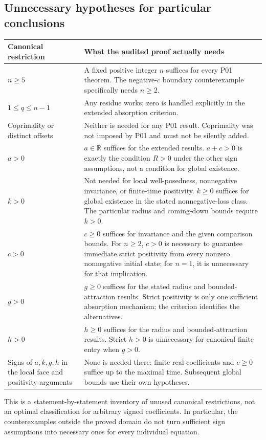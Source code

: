 \documentclass[11pt]{article}
\newcommand{\RR}{\mathbb R}
\begin{document}
\subsection{Unnecessary hypotheses for particular conclusions}
\begin{longtable}{@{}P{0.30\textwidth}P{0.65\textwidth}@{}}
\toprule
Canonical restriction & What the audited proof actually needs \\
\midrule\endhead
$n\geq5$ & A fixed positive integer $n$ suffices for every P01 theorem.
The negative-$c$ boundary counterexample specifically needs $n\geq2$. \\
$1\leq q\leq n-1$ & Any residue works; zero is handled explicitly in
the extended absorption criterion. \\
Coprimality or distinct offsets & Neither is needed for any P01 result.
Coprimality was not imposed by P01 and must not be silently added. \\
$a>0$ & $a\in\RR$ suffices for the extended results. $a+c>0$ is exactly
the condition $R>0$ under the other sign assumptions, not a condition
for global existence. \\
$k>0$ & Not needed for local well-posedness, nonnegative invariance,
or finite-time positivity. $k\geq0$ suffices for global existence in
the stated nonnegative-loss class. The particular radius and coming-down
bounds require $k>0$. \\
$c>0$ & $c\geq0$ suffices for invariance and the given comparison bounds.
For $n\geq2$, $c>0$ is necessary to guarantee immediate strict positivity
from every nonzero nonnegative initial state; for $n=1$, it is unnecessary
for that implication. \\
$g>0$ & $g\geq0$ suffices for the stated radius and bounded-attraction
results. Strict positivity is only one sufficient absorption mechanism;
the criterion identifies the alternatives. \\
$h>0$ & $h\geq0$ suffices for the radius and bounded-attraction results.
Strict $h>0$ is unnecessary for canonical finite entry when $g>0$. \\
Signs of $a,k,g,h$ in the local face and positivity arguments & None
is needed there: finite real coefficients and $c\geq0$ suffice up to
the maximal time. Subsequent global bounds use their own hypotheses. \\
\bottomrule
\end{longtable}
This is a statement-by-statement inventory of unused canonical
restrictions, not an optimal classification for arbitrary signed
coefficients. In particular, the counterexamples outside the proved
domain do not turn sufficient sign assumptions into necessary ones
for every individual equation.
\end{document}
